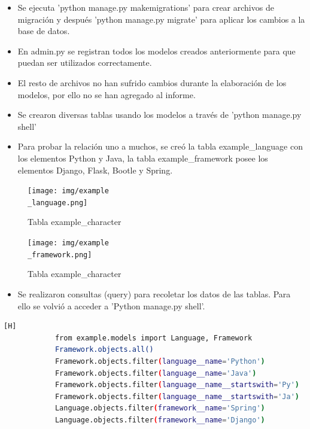 \documentclass{article}
\begin{document}
        \begin{itemize}	
		\item Se ejecuta 'python manage.py makemigrations' para crear archivos de migración y después 'python manage.py migrate' para aplicar los cambios a la base de datos.
            \item En admin.py se registran todos los modelos creados anteriormente para que puedan ser utilizados correctamente.
            \item El resto de archivos no han sufrido cambios durante la elaboración de los modelos, por ello no se han agregado al informe.
        \end{itemize}
        

        \begin{itemize}
            \item Se crearon diversas tablas usando los modelos a través de 'python manage.py shell'
            \item Para probar la relación uno a muchos, se creó la tabla example\_language con los elementos Python y Java, la tabla example\_framework posee los elementos Django, Flask, Bootle y Spring.
        \end{itemize}    
        \begin{figure}[ht]
        \centering
        \texttt{[image: img/example\\\_language.png]}
        \caption*{Tabla example\_character}
        \end{figure}
        \begin{figure}[ht]
        \centering
        \texttt{[image: img/example\\\_framework.png]}
        \caption*{Tabla example\_character}
        \end{figure}

        \begin{itemize}
            \item Se realizaron consultas (query) para recoletar los datos de las tablas. Para ello se volvió a acceder a 'Python manage.py shell'.
        \end{itemize}
        \begin{lstlisting}[language=bash,caption={Query One To Many}][H]
            from example.models import Language, Framework
            Framework.objects.all()
            Framework.objects.filter(language__name='Python')
            Framework.objects.filter(language__name='Java')
            Framework.objects.filter(language__name__startswith='Py')
            Framework.objects.filter(language__name__startswith='Ja')
            Language.objects.filter(framework__name='Spring')
            Language.objects.filter(framework__name='Django')
	\end{lstlisting}
\end{document}

